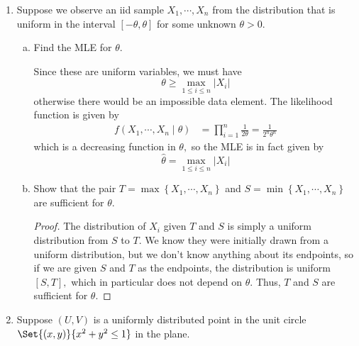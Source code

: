 \documentclass{article}
\begin{document}
\begin{enumerate}
\begin{enumerate}[(a)]
		\end{enumerate}

		\newpage
	\item Suppose we observe an iid sample $X_1, \cdots, X_n$ from the distribution that is uniform in the interval $[-\theta, \theta]$ for some unknown $\theta>0.$

		\begin{enumerate}[(a)]
			\item Find the MLE for $\theta.$
				\begin{soln}
					Since these are uniform variables, we must have \[\theta\ge \max_{1\le i\le n} \left\lvert X_i \right\rvert\] otherwise there would be an impossible data element. The likelihood function is given by 
					\begin{align*}
						f(X_1, \cdots, X_n\mid \theta) &= \prod_{i=1}^{n} \frac{1}{2\theta} = \frac{1}{2^n \theta^n}
					\end{align*} which is a decreasing function in $\theta,$ so the MLE is in fact given by \[\hat{\theta}=\max_{1\le i\le n} \left\lvert X_i \right\rvert\] 
				\end{soln}

			\item Show that the pair $T=\max\left\{ X_1, \cdots, X_n \right\}$ and $S=\min\left\{ X_1, \cdots, X_n \right\}$ are sufficient for $\theta.$
				\begin{proof}
					The distribution of $X_i$ given $T$ and $S$ is simply a uniform distribution from $S$ to $T.$ We know they were initially drawn from a uniform distribution, but we don't know anything about its endpoints, so if we are given $S$ and $T$ as the endpoints, the distribution is uniform $[S, T],$ which in particular does not depend on $\theta.$ Thus, $T$ and $S$ are sufficient for $\theta.$
					
				\end{proof}
				
		\end{enumerate}

	\item Suppose $(U, V)$ is a uniformly distributed point in the unit circle $\Set{(x, y)}{x^2+y^2\le 1}$ in the plane. 


\end{enumerate}
\end{document}
